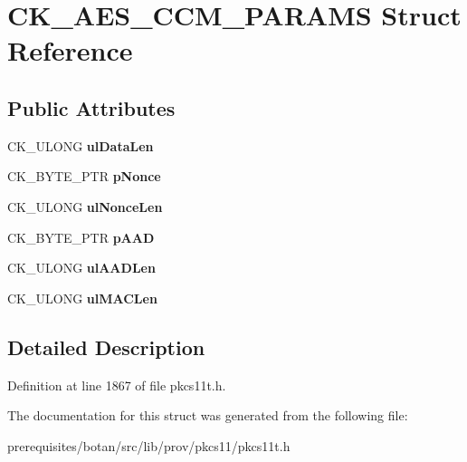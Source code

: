 \hypertarget{struct_c_k___a_e_s___c_c_m___p_a_r_a_m_s}{}\section{C\+K\+\_\+\+A\+E\+S\+\_\+\+C\+C\+M\+\_\+\+P\+A\+R\+A\+MS Struct Reference}
\label{struct_c_k___a_e_s___c_c_m___p_a_r_a_m_s}
\subsection*{Public Attributes}
\begin{DoxyCompactItemize}
\item 
\mbox{\label{struct_c_k___a_e_s___c_c_m___p_a_r_a_m_s_a854e99af78928ab9f7b70531ce6b96dc}} 
C\+K\+\_\+\+U\+L\+O\+NG {\bfseries ul\+Data\+Len}
\item 
\mbox{\label{struct_c_k___a_e_s___c_c_m___p_a_r_a_m_s_a42fe17b551f16efdd4d79f7fb41b00e3}} 
C\+K\+\_\+\+B\+Y\+T\+E\+\_\+\+P\+TR {\bfseries p\+Nonce}
\item 
\mbox{\label{struct_c_k___a_e_s___c_c_m___p_a_r_a_m_s_ad1878e65f15a3a3c0377f18e715ccbfc}} 
C\+K\+\_\+\+U\+L\+O\+NG {\bfseries ul\+Nonce\+Len}
\item 
\mbox{\label{struct_c_k___a_e_s___c_c_m___p_a_r_a_m_s_a881dd36333a5b20f4cff8cf0c3d3e4e2}} 
C\+K\+\_\+\+B\+Y\+T\+E\+\_\+\+P\+TR {\bfseries p\+A\+AD}
\item 
\mbox{\label{struct_c_k___a_e_s___c_c_m___p_a_r_a_m_s_a3630d0c883db06e8ba21cf7479b5cfba}} 
C\+K\+\_\+\+U\+L\+O\+NG {\bfseries ul\+A\+A\+D\+Len}
\item 
\mbox{\label{struct_c_k___a_e_s___c_c_m___p_a_r_a_m_s_a7b13c9f4f543a8ff00776f3b56b821f9}} 
C\+K\+\_\+\+U\+L\+O\+NG {\bfseries ul\+M\+A\+C\+Len}
\end{DoxyCompactItemize}


\subsection{Detailed Description}


Definition at line 1867 of file pkcs11t.\+h.



The documentation for this struct was generated from the following file\+:\begin{DoxyCompactItemize}
\item 
prerequisites/botan/src/lib/prov/pkcs11/pkcs11t.\+h\end{DoxyCompactItemize}
